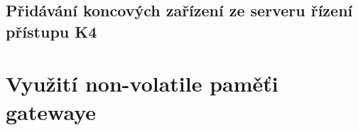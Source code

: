     



\subsection{Přidávání koncových zařízení ze serveru řízení přístupu K4}



\section{Využití non-volatile paměťi gatewaye}

